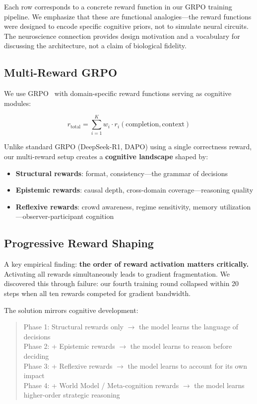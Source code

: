 \documentclass[11pt,a4paper]{article}
\begin{document}
Each row corresponds to a concrete reward function in our GRPO training pipeline. We emphasize that these are functional analogies---the reward functions were designed to encode specific cognitive priors, not to simulate neural circuits. The neuroscience connection provides design motivation and a vocabulary for discussing the architecture, not a claim of biological fidelity.

\subsection{Multi-Reward GRPO}

We use GRPO~\citep{shao2024} with domain-specific reward functions serving as cognitive modules:

\begin{equation}
r_{\text{total}} = \sum_{i=1}^{K} w_i \cdot r_i(\text{completion}, \text{context})
\end{equation}

Unlike standard GRPO (DeepSeek-R1, DAPO) using a single correctness reward, our multi-reward setup creates a \textbf{cognitive landscape} shaped by:
\begin{itemize}[leftmargin=*]
\item \textbf{Structural rewards}: format, consistency---the grammar of decisions
\item \textbf{Epistemic rewards}: causal depth, cross-domain coverage---reasoning quality
\item \textbf{Reflexive rewards}: crowd awareness, regime sensitivity, memory utilization---observer-participant cognition
\end{itemize}

\subsection{Progressive Reward Shaping}

A key empirical finding: \textbf{the order of reward activation matters critically.} Activating all rewards simultaneously leads to gradient fragmentation. We discovered this through failure: our fourth training round collapsed within 20 steps when all ten rewards competed for gradient bandwidth.

The solution mirrors cognitive development:

\begin{quote}
Phase 1: Structural rewards only $\to$ the model learns the language of decisions\\
Phase 2: + Epistemic rewards $\to$ the model learns to reason before deciding\\
Phase 3: + Reflexive rewards $\to$ the model learns to account for its own impact\\
Phase 4: + World Model / Meta-cognition rewards $\to$ the model learns higher-order strategic reasoning
\end{quote}
\end{document}
